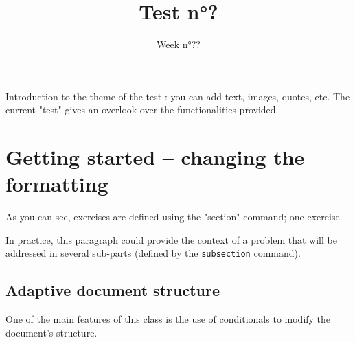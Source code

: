 \documentclass[12pt,code]{HSP-Test}
\title{Test n°?}
\date{Week n°??}
\begin{document}
	
	Introduction to the theme of the test : you can add text, images, quotes, etc. The current "test" gives an overlook over the functionalities provided.
	
	\section{Getting started -- changing the formatting}
	
	As you can see, exercises are defined using the "section" command; one exercise.
	
	In practice, this paragraph could provide the context of a problem that will be addressed in several sub-parts (defined by the \texttt{subsection} command).
	
	\subsection{Adaptive document structure}
	One of the main features of this class is the use of conditionals to modify the document's structure.
	
\end{document}
